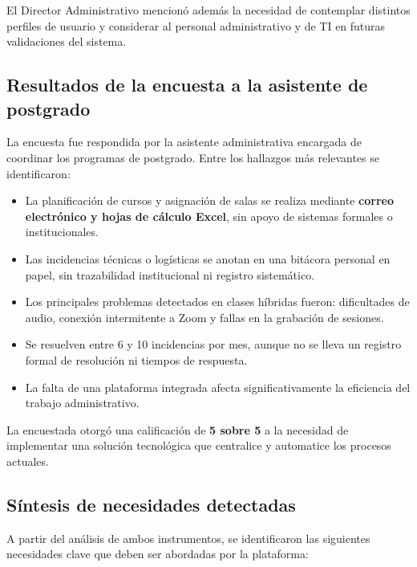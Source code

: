 El Director Administrativo mencionó además la necesidad de contemplar distintos perfiles de usuario y considerar al personal administrativo y de TI en futuras validaciones del sistema.

\subsection{Resultados de la encuesta a la asistente de postgrado}

La encuesta fue respondida por la asistente administrativa encargada de coordinar los programas de postgrado. Entre los hallazgos más relevantes se identificaron:

\begin{itemize}
    \item La planificación de cursos y asignación de salas se realiza mediante \textbf{correo electrónico y hojas de cálculo Excel}, sin apoyo de sistemas formales o institucionales.
    \item Las incidencias técnicas o logísticas se anotan en una bitácora personal en papel, sin trazabilidad institucional ni registro sistemático.
    \item Los principales problemas detectados en clases híbridas fueron: dificultades de audio, conexión intermitente a Zoom y fallas en la grabación de sesiones.
    \item Se resuelven entre 6 y 10 incidencias por mes, aunque no se lleva un registro formal de resolución ni tiempos de respuesta.
    \item La falta de una plataforma integrada afecta significativamente la eficiencia del trabajo administrativo.
\end{itemize}

La encuestada otorgó una calificación de \textbf{5 sobre 5} a la necesidad de implementar una solución tecnológica que centralice y automatice los procesos actuales.

\subsection{Síntesis de necesidades detectadas}

A partir del análisis de ambos instrumentos, se identificaron las siguientes necesidades clave que deben ser abordadas por la plataforma:

